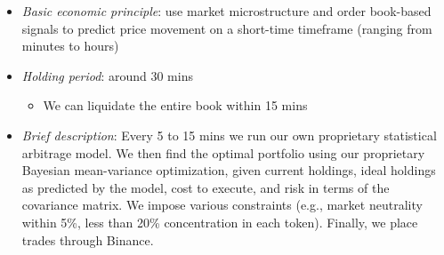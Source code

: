 \documentclass[11pt, letterpaper]{article}
\providecommand{\tightlist}{%
\setlength{\itemsep}{0pt}
\setlength{\parskip}{0pt}}
\begin{document}
\begin{itemize}
\begin{itemize}
        \item \emph{Sharpe ratio} (measure of risk-adjusted returns): \textasciitilde7

        \item \emph{Risk characteristics}: market neutral within 5\%, less
          than 20\% concentration in each token, the longest drawdown was
          14 days
      \end{itemize}

    \item \emph{Basic economic principle}: use market microstructure and
      order book-based signals to predict price movement on a short-time
      timeframe (ranging from minutes to hours)

    \item \emph{Holding period}: around 30 mins

      \begin{itemize}
        \tightlist

        \item We can liquidate the entire book within 15 mins
      \end{itemize}

    \item \emph{Brief description}: Every 5 to 15 mins we run our own proprietary
      statistical arbitrage model. We then find the optimal portfolio
      using our proprietary Bayesian mean-variance optimization, given current
      holdings, ideal holdings as predicted by the model, cost to execute,
      and risk in terms of the covariance matrix. We impose various constraints
      (e.g., market neutrality within 5\%, less than 20\% concentration in
      each token). Finally, we place trades through Binance.
  \end{itemize}
\end{document}
